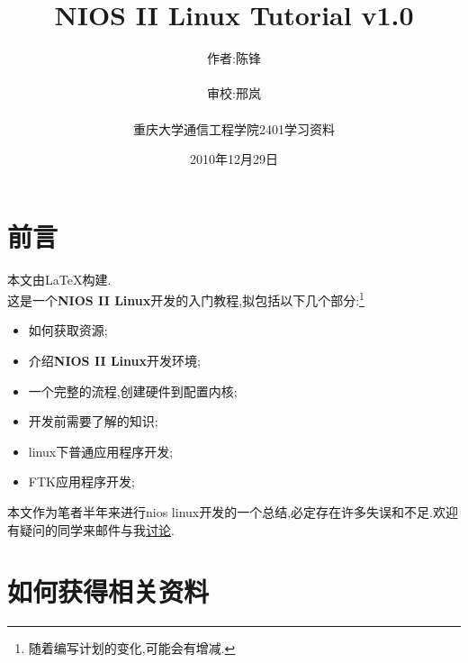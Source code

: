 \documentclass[12pt,a4paper,titlepage]{article}
\title{NIOS II Linux Tutorial v1.0}
\author{作者:陈锋\\\\审校:邢岚\\\\重庆大学通信工程学院2401学习资料}
\date{2010年12月29日}
\begin{document}
\thispagestyle{empty}
\maketitle{}
\section{前言}
\setcounter{footnote}{0}
本文由\LaTeX{}构建.
\\

这是一个\textbf{NIOS II Linux}开发的入门教程,拟包括以下几个部分:\footnote{随着编写计划的变化,可能会有增减.}
\begin{itemize}
\item 如何获取资源;
\item 介绍\textbf{NIOS II Linux}开发环境;
\item 一个完整的流程,创建硬件到配置内核;
\item 开发前需要了解的知识;
\item linux下普通应用程序开发;
\item FTK应用程序开发;
\end{itemize}

本文作为笔者半年来进行nios linux开发的一个总结,必定存在许多失误和不足.欢迎有疑问的同学来邮件与我\href{mailto:cfistalent@gmail.com}{讨论}.
\newpage{}
\section{如何获得相关资料}
\setcounter{footnote}{0}
\end{document}
